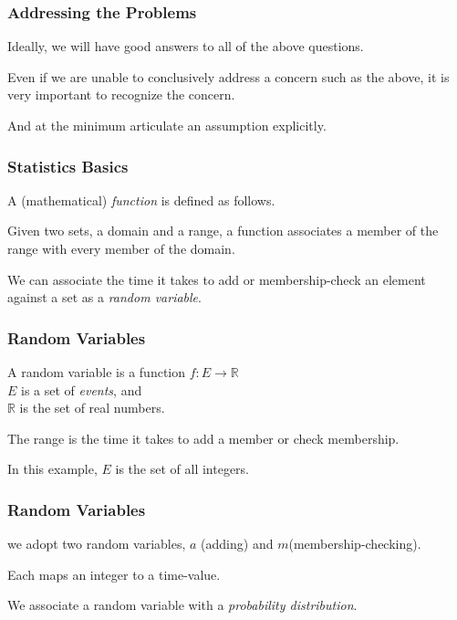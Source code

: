 \begin{frame}
\frametitle{Addressing the Problems}
\begin{changemargin}{1cm}

Ideally, we will have good answers to all of the above questions.

Even if we are unable to conclusively address a concern such
as the above, it is very important to recognize the concern. 

And
at the minimum articulate an assumption explicitly.

\end{changemargin}
\end{frame}

\begin{frame}
\frametitle{Statistics Basics}
\begin{changemargin}{1cm}

A (mathematical) \emph{function} is defined as follows. 

Given two sets, a domain and a range, a function associates a member of the
range with every member of the domain.

We can associate the time it takes to add or membership-check
an element against a set as a \emph{random variable}.

\end{changemargin}
\end{frame}

\begin{frame}
\frametitle{Random Variables}
\begin{changemargin}{1cm}

A random variable is a function
$f\!\! : E \longrightarrow \mathbb{R}$\\
\quad $E$ is a set of \emph{events}, and\\
\quad $\mathbb{R}$ is the set of real numbers.


The range is the time it takes to add a member or check membership.

In this example, $E$ is the set of all integers.

\end{changemargin}
\end{frame}


\begin{frame}
\frametitle{Random Variables}
\begin{changemargin}{1cm}

we adopt two random variables, $a$ (adding) and $m$(membership-checking). 

Each maps an integer to a time-value. 

We associate a random variable with a \emph{probability distribution}.

\end{changemargin}
\end{frame}



